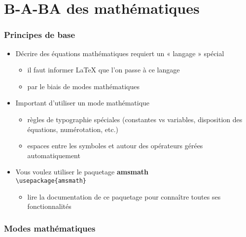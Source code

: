 \section{B-A-BA des mathématiques}


\begin{frame}[fragile]

	\frametitle{Principes de base}
	
	\begin{itemize}
		\item Décrire des équations mathématiques requiert un « langage » spécial
		\begin{itemize}
			\item il faut informer {\LaTeX} que l’on passe à ce langage
			\item par le biais de modes mathématiques
		\end{itemize}
	
		\item Important d’utiliser un mode mathématique
		\begin{itemize}
			\item règles de typographie spéciales (constantes vs variables, disposition des équations, 	numérotation, etc.)
			\item espaces entre les symboles et autour des opérateurs gérées automatiquement
		\end{itemize}
	
		\item Vous voulez utiliser le paquetage \textbf{amsmath} \\
			\lstinline|\usepackage{amsmath}|
			\begin{itemize}
				\item lire la documentation de ce paquetage pour connaître toutes ses fonctionnalités
			\end{itemize}
	\end{itemize}
\end{frame}


\begin{frame}[fragile]

	\frametitle{Modes mathématiques}
	
\end{frame}